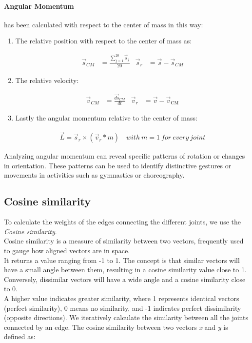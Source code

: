 \paragraph{Angular Momentum} has been calculated with respect to the center of mass in this way:
\begin{enumerate}
  \item The relative position with respect to the center of mass as: 
  \begin{table}[h]
    \begin{align}
        \vec{s}_{CM} &= \frac{{\sum_{j=1}^{20} \vec{s}_{j}}}{{20}} &
        \vec{s}_{r} &= \vec{s} - \vec{s}_{CM} \label{eq:rel_pos}
    \end{align}
  \end{table}
  \item The relative velocity:
  \begin{table}[H]
    \begin{align}
        \vec{v}_{CM} &= \frac{\vec{ds}_{CM}}{dt} &
        \vec{v}_{r} &= \vec{v} - \vec{v}_{\text{CM}} \label{eq:rel_vel}
    \end{align}
  \end{table}
  \item Lastly the angular momentum relative to the center of mass:
  \begin{table}[H]
    \begin{align}
      \vec{L} = \vec{s}_{r} \times (\vec{v}_{r} * m) \quad with \ m = 1 \ for \ every \ joint \label{eq:ang_mom}
    \end{align}
  \end{table}
\end{enumerate}

Analyzing angular momentum can reveal specific patterns of rotation or changes in orientation.
These patterns can be used to identify distinctive gestures or movements in activities such as gymnastics or choreography.

\subsection{Cosine similarity} 
    
To calculate the weights of the edges connecting the different joints, we use the \textit{Cosine similarity}. \\ 
Cosine similarity is a measure of similarity between two vectors, frequently used to gauge how aligned vectors are in space. \\ 
It returns a value ranging from -1 to 1. 
The concept is that similar vectors will have a small angle between them, resulting in a cosine similarity value close to 1. \\ 
Conversely, dissimilar vectors will have a wide angle and a cosine similarity close to 0.\\ 
A higher value indicates greater similarity, where 1 represents identical vectors (perfect similarity), 0 means no similarity, and -1 indicates perfect dissimilarity (opposite directions). 
We iteratively calculate the similarity between all the joints connected by an edge. 
The cosine similarity between two vectors \textit{x} and \textit{y} is defined as: 

